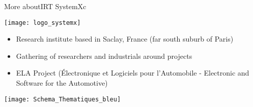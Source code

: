 \documentclass[english,slidetop,9pt,aspectratio=169]{beamer}
\begin{document}
  \begin{myframe}[2]{More about}{IRT SystemX}{c}
    \begin{minipage}{0.3\textwidth}
      \centering
      \texttt{[image: logo\_systemx]}
      \begin{itemize}
        \item Research institute based in Saclay, France (far south suburb of Paris)
        \item Gathering of researchers and industrials around projects
        \item ELA Project (\'{E}lectronique et Logiciels pour l'Automobile -
          Electronic and Software for the Automotive)
      \end{itemize}
    \end{minipage}
    \begin{minipage}{0.6\textwidth}
      \begin{center}
        \centering
        \texttt{[image: Schema\_Thematiques\_bleu]}
      \end{center}
    \end{minipage}
  \end{myframe}
\end{document}

